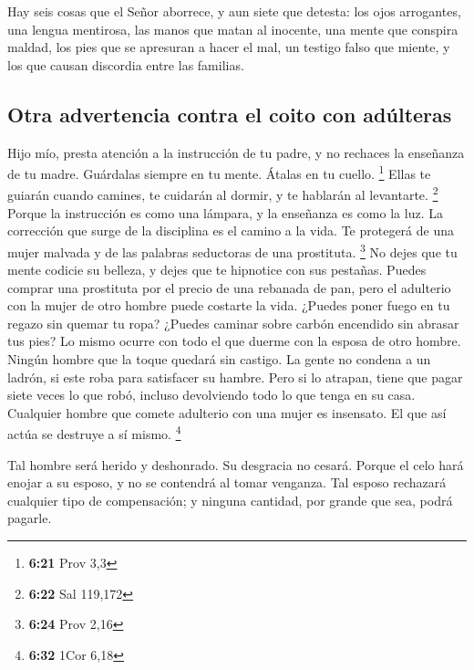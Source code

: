  Hay seis cosas que el Señor aborrece, y aun siete que
detesta:  los ojos arrogantes, una lengua mentirosa, las
manos que matan al inocente,  una mente que conspira
maldad, los pies que se apresuran a hacer el mal,  un
testigo falso que miente, y los que causan discordia entre las familias.

\hypertarget{otra-advertencia-contra-el-coito-con-aduxfalteras}{%
\subsection{Otra advertencia contra el coito con
adúlteras}\label{otra-advertencia-contra-el-coito-con-aduxfalteras}}

 Hijo mío, presta atención a la instrucción de tu padre,
y no rechaces la enseñanza de tu madre.  Guárdalas
siempre en tu mente. Átalas en tu cuello. \footnote{\textbf{6:21} Prov
  3,3}  Ellas te guiarán cuando camines, te cuidarán al
dormir, y te hablarán al levantarte. \footnote{\textbf{6:22} Sal 119,172}
 Porque la instrucción es como una lámpara, y la
enseñanza es como la luz. La corrección que surge de la disciplina es el
camino a la vida.  Te protegerá de una mujer malvada y de
las palabras seductoras de una prostituta. \footnote{\textbf{6:24} Prov
  2,16}  No dejes que tu mente codicie su belleza, y
dejes que te hipnotice con sus pestañas.  Puedes comprar
una prostituta por el precio de una rebanada de pan, pero el adulterio
con la mujer de otro hombre puede costarte la vida. 
¿Puedes poner fuego en tu regazo sin quemar tu ropa? 
¿Puedes caminar sobre carbón encendido sin abrasar tus pies?
 Lo mismo ocurre con todo el que duerme con la esposa de
otro hombre. Ningún hombre que la toque quedará sin castigo.
 La gente no condena a un ladrón, si este roba para
satisfacer su hambre.  Pero si lo atrapan, tiene que
pagar siete veces lo que robó, incluso devolviendo todo lo que tenga en
su casa.  Cualquier hombre que comete adulterio con una
mujer es insensato. El que así actúa se destruye a sí mismo. \footnote{\textbf{6:32}
  1Cor 6,18}

 Tal hombre será herido y deshonrado. Su desgracia no
cesará.  Porque el celo hará enojar a su esposo, y no se
contendrá al tomar venganza.  Tal esposo rechazará
cualquier tipo de compensación; y ninguna cantidad, por grande que sea,
podrá pagarle.

